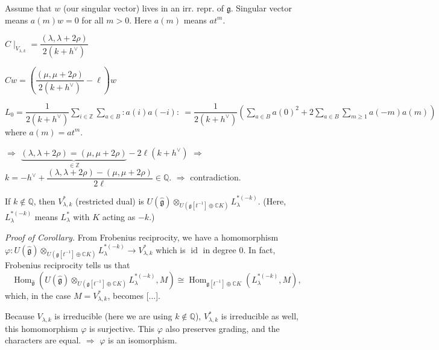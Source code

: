 \documentclass[etingof-lie.tex]{subfiles}
\begin{document}
Assume that $w$ (our singular vector) lives in an irr. repr. of $\mathfrak{g}%
$. Singular vector means $a\left(  m\right)  w=0$ for all $m>0$. Here
$a\left(  m\right)  $ means $at^{m}$.

$C\mid_{V_{\lambda,k}}=\dfrac{\left(  \lambda,\lambda+2\rho\right)  }{2\left(
k+h^{\vee}\right)  }$

$Cw=\left(  \dfrac{\left(  \mu,\mu+2\rho\right)  }{2\left(  k+h^{\vee}\right)
}-\ell\right)  w$

$L_{0}=\dfrac{1}{2\left(  k+h^{\vee}\right)  }\sum_{i\in\mathbb{Z}}\sum_{a\in
B}:a\left(  i\right)  a\left(  -i\right)  :\ =\dfrac{1}{2\left(  k+h^{\vee
}\right)  }\left(  \sum_{a\in B}a\left(  0\right)  ^{2}+2\sum_{a\in B}%
\sum_{m\geq1}a\left(  -m\right)  a\left(  m\right)  \right)  $ where $a\left(
m\right)  =at^{m}$.

$\Longrightarrow$ $\underbrace{\left(  \lambda,\lambda+2\rho\right)  =\left(
\mu,\mu+2\rho\right)  }_{\in\mathbb{Z}}-2\ell\left(  k+h^{\vee}\right)  $
$\Longrightarrow$ $k=-h^{\vee}+\dfrac{\left(  \lambda,\lambda+2\rho\right)
-\left(  \mu,\mu+2\rho\right)  }{2\ell}\in\mathbb{Q}$. $\Longrightarrow$ contradiction.

\begin{corollary}
If $k\notin\mathbb{Q}$, then $V_{\lambda,k}^{\ast}$ (restricted dual) is
$U\left(  \widehat{\mathfrak{g}}\right)  \otimes_{U\left(  \mathfrak{g}\left[
t^{-1}\right]  \oplus\mathbb{C}K\right)  }L_{\lambda}^{\ast\left(  -k\right)
}$. (Here, $L_{\lambda}^{\ast\left(  -k\right)  }$ means $L_{\lambda}^{\ast}$
with $K$ acting as $-k$.)
\end{corollary}

\textit{Proof of Corollary.} From Frobenius reciprocity, we have a
homomorphism $\varphi:U\left(  \widehat{\mathfrak{g}}\right)  \otimes
_{U\left(  \mathfrak{g}\left[  t^{-1}\right]  \oplus\mathbb{C}K\right)
}L_{\lambda}^{\ast\left(  -k\right)  }\rightarrow V_{\lambda,k}^{\ast}$ which
is $\operatorname*{id}$ in degree $0$. In fact, Frobenius reciprocity tells us
that%
\[
\operatorname*{Hom}\nolimits_{\widehat{\mathfrak{g}}}\left(  U\left(
\widehat{\mathfrak{g}}\right)  \otimes_{U\left(  \mathfrak{g}\left[
t^{-1}\right]  \oplus\mathbb{C}K\right)  }L_{\lambda}^{\ast\left(  -k\right)
},M\right)  \cong\operatorname*{Hom}\nolimits_{\mathfrak{g}\left[
t^{-1}\right]  \oplus\mathbb{C}K}\left(  L_{\lambda}^{\ast\left(  -k\right)
},M\right)  ,
\]
which, in the case $M=V_{\lambda,k}^{\ast}$, becomes [...].

Because $V_{\lambda,k}$ is irreducible (here we are using $k\notin\mathbb{Q}%
$), $V_{\lambda,k}^{\ast}$ is irreducible as well, this homomorphism $\varphi$
is surjective. This $\varphi$ also preserves grading, and the characters are
equal. $\Longrightarrow$ $\varphi$ is an isomorphism.
\end{document}
